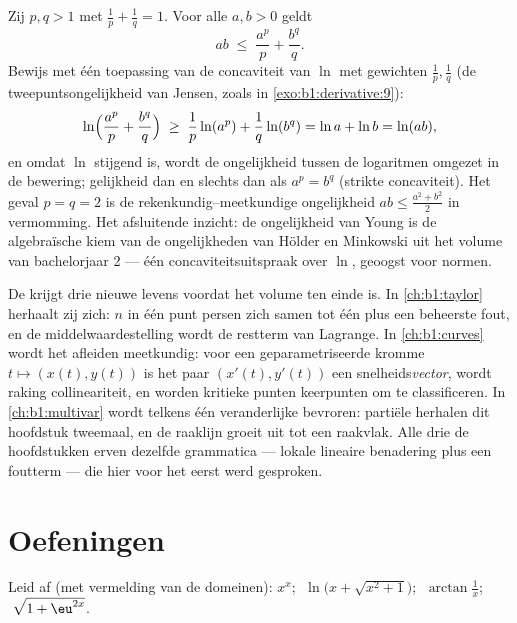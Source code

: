\begin{example}\label{ex:b1:derivative:young}
Zij $p, q > 1$ met $\frac1p + \frac1q = 1$. Voor alle $a, b > 0$
geldt
\[
ab \;\leq\; \frac{a^p}{p} + \frac{b^q}{q} .
\]
Bewijs met één toepassing van de concaviteit van $\ln$ met
gewichten $\frac1p, \frac1q$ (de tweepuntsongelijkheid van
Jensen, zoals in \cref{exo:b1:derivative:9}):
\[
\ln\Bigl(\frac{a^p}{p} + \frac{b^q}{q}\Bigr)
\;\geq\; \frac1p \ln(a^p) + \frac1q \ln(b^q)
= \ln a + \ln b = \ln(ab),
\]
en omdat $\ln$ stijgend is, wordt de ongelijkheid tussen de
logaritmen omgezet in de bewering; gelijkheid dan en slechts dan
als $a^p = b^q$ (strikte concaviteit). Het geval $p = q = 2$ is
de rekenkundig--meetkundige ongelijkheid $ab \leq \frac{a^2 +
b^2}{2}$ in vermomming. Het afsluitende inzicht: de ongelijkheid
van Young is de algebraïsche kiem van de ongelijkheden van Hölder
en Minkowski uit het volume van bachelorjaar 2 --- één
concaviteitsuitspraak over $\ln$, geoogst voor normen.
\end{example}

\begin{remark}
De  krijgt drie nieuwe levens voordat het volume ten
einde is. In \cref{ch:b1:taylor} herhaalt zij zich: $n$ 
in één punt persen zich samen tot één  plus een beheerste
fout, en de middelwaardestelling wordt de restterm van Lagrange.
In \cref{ch:b1:curves} wordt het afleiden meetkundig: voor een
geparametriseerde kromme $t \mapsto (x(t), y(t))$ is het paar
$(x'(t), y'(t))$ een snelheids\emph{vector}, wordt raking
collineariteit, en worden kritieke punten keerpunten om te
classificeren. In \cref{ch:b1:multivar} wordt telkens één
veranderlijke bevroren: partiële  herhalen dit
hoofdstuk tweemaal, en de raaklijn groeit uit tot een raakvlak.
Alle drie de hoofdstukken erven dezelfde grammatica --- lokale
lineaire benadering plus een foutterm --- die hier voor het eerst
werd gesproken.
\end{remark}

\section{Oefeningen}

\begin{exercise}[$\star$]\label{exo:b1:derivative:1}
Leid af (met vermelding van de domeinen): $x^x$;
$\;\ln\bigl(x + \sqrt{x^2+1}\bigr)$; $\;\arctan\frac{1}{x}$;
$\;\sqrt{1 + \eu^{2x}}$.
\end{exercise}

